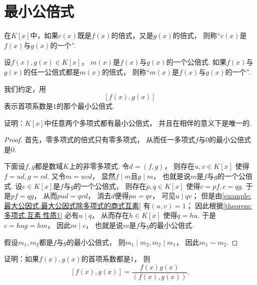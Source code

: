 \section{最小公倍式}
\begin{definition}
在\(K[x]\)中，如果\(c(x)\)既是\(f(x)\)的倍式，又是\(g(x)\)的倍式，
则称“\(c(x)\)是\(f(x)\)与\(g(x)\)的一个”.
\end{definition}

\begin{definition}
设\(f(x),g(x) \in K[x]\)，
\(m(x)\)是\(f(x)\)与\(g(x)\)的一个公倍式.
如果\(f(x)\)与\(g(x)\)的任一公倍式都是\(m(x)\)的倍式，
则称“\(m(x)\)是\(f(x)\)与\(g(x)\)的一个”.
\end{definition}

我们约定，用\[
	[f(x), g(x)]
\]表示首项系数是\(1\)的那个最小公倍式.

\begin{example}
证明：\(K[x]\)中任意两个多项式都有最小公倍式，
并且在相伴的意义下是唯一的.
\begin{proof}
首先，零多项式的倍式只有零多项式，
从而任一多项式\(f\)与\(0\)的最小公倍式是\(0\).

下面设\(f,g\)都是数域\(K\)上的非零多项式.
令\(d=(f,g)\)，
则存在\(u,v \in K[x]\)
使得\(f=ud,g=vd\).
又令\(m=uvd\)，
显然\(f \mid m\)且\(g \mid m\)，
也就是说\(m\)是\(f\)与\(g\)的一个公倍式.
设\(c \in K[x]\)是\(f\)与\(g\)的一个公倍式，
则存在\(p,q \in K[x]\)
使得\(c=pf,c=qg\).
于是\(pf=qg\)，
从而\(pud=qvd\)，
消去\(d\)便得\(pu=qv\)，
可见\(u \mid qv\)；
但是由\cref{example:最大公因式.最大公因式除多项式的商式互素}
有\((u,v)=1\)；
因此根据\cref{theorem:多项式.互素.性质1}
必有\(u \mid q\)，
从而存在\(h \in K[x]\)
使得\(q=hu\).
于是\(c=hug=hm\)，
因此\(m \mid c\)，
也就是说\(m\)是\(f\)与\(g\)的最小公倍式.

假设\(m_1,m_2\)都是\(f\)与\(g\)的最小公倍式，
则\(m_1 \mid m_2,
m_2 \mid m_1\)，
因此\(m_1 \sim m_2\).
\end{proof}
\end{example}

\begin{example}
证明：如果\(f(x),g(x)\)的首项系数都是\(1\)，
则\[
	[f(x),g(x)]
	= \frac{f(x) g(x)}{(f(x),g(x))}.
\]
\end{example}
